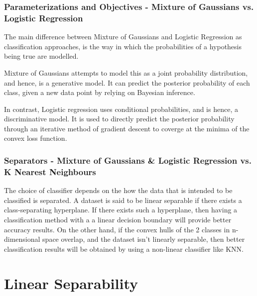 \documentclass[a4paper]{article}
\begin{document}
\subsubsection*{Parameterizations and Objectives - Mixture of Gaussians vs. Logistic Regression}
The main difference between Mixture of Gaussians and Logistic Regression as classification approaches, is the way in which the probabilities of a hypothesis being true are modelled. 

Mixture of Gaussians attempts to model this as a joint probability distribution, and hence, is a generative model. It can predict the posterior probability of each class, given a new data point by relying on Bayesian inference. 

In contrast, Logistic regression uses conditional probabilities, and is hence, a discriminative model. It is used to directly predict the posterior probability through an iterative method of gradient descent to coverge at the minima of the convex loss function.

\subsubsection*{Separators - Mixture of Gaussians \& Logistic Regression vs. K Nearest Neighbours}
The choice of classifier depends on the how the data that is intended to be classified is separated.
A dataset is said to be linear separable if there exists a class-separating hyperplane. If there exists such a hyperplane, then having a classification method with a a linear decision boundary will provide better accuracy results.
On the other hand, if the convex hulls of the 2 classes in n-dimensional space overlap, and the dataset isn't linearly separable, then better classification results will be obtained by using a non-linear classifier like KNN.

\newpage

\section{Linear Separability}
\end{document}
